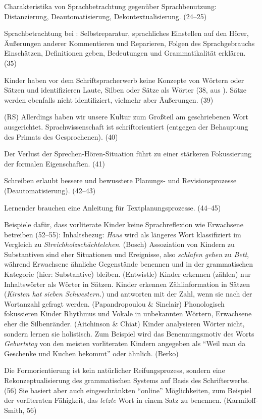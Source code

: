 Charakteristika von Sprachbetrachtung gegenüber Sprachbenutzung: Distanzierung, Deautomatisierung, Dekontextualisierung. (24--25)

Sprachbetrachtung bei \citet{Clark1978}: Selbstreparatur, sprachliches Einstellen auf den Hörer, Äußerungen anderer Kommentieren und Reparieren, Folgen des Sprachgebrauchs Einschätzen, Definitionen geben, Bedeutungen und Grammatikalität erklären. (35)

Kinder haben vor dem Schriftspracherwerb keine Konzepte von Wörtern oder Sätzen und identifizieren Laute, Silben oder Sätze als Wörter (38, aus \citealt{SteinigHuneke2002}).
Sätze werden ebenfalls nicht identifiziert, vielmehr aber Äußerungen. (39)

(RS) Allerdings haben wir unsere Kultur zum Großteil am geschriebenen Wort ausgerichtet.
Sprachwissenschaft ist schriftorientiert (entgegen der Behauptung des Primats des Gesprochenen). (40)

Der Verlust der Sprechen-Hören-Situation führt zu einer stärkeren Fokussierung der formalen Eigenschaften. (41)

Schreiben erlaubt bessere und bewusstere Planungs- und Revisionsprozesse (Deautomatisierung). (42--43)

Lernender brauchen eine Anleitung für Textplanungsprozesse. (44--45)

Beispiele dafür, dass vorliterate Kinder keine Sprachreflexion wie Erwachsene betreiben (52--55):
Inhaltsbezug: \textit{Haus} wird als längeres Wort klassifiziert im Vergleich zu \textit{Streichholzschächtelchen}. (Bosch)
Assoziation von Kindern zu Substantiven sind eher Situationen und Ereignisse, also \textit{schlafen gehen} zu \textit{Bett}, während Erwachsene ähnliche Gegenstände benennen und in der grammatischen Kategorie (hier: Substantive) bleiben. (Entwistle)
Kinder erkennen (zählen) nur Inhaltswörter als Wörter in Sätzen.
Kinder erkennen Zählinformation in Sätzen (\textit{Kirsten hat sieben Schwestern.}) und antworten mit der Zahl, wenn sie nach der Wortanzahl gefragt werden. (Papandropoulou \& Sinclair)
Phonologisch fokussieren Kinder Rhythmus und Vokale in unbekannten Wörtern, Erwachsene eher die Silbenränder. (Aitchinson \& Chiat)
Kinder analysieren Wörter nicht, sondern lernen sie holistisch. Zum Beispiel wird das Benennungsmotiv des Worts \textit{Geburtstag} von den meisten vorliteraten Kindern angegeben als "`Weil man da Geschenke und Kuchen bekommt"' oder ähnlich. (Berko)

Die Formorientierung ist kein natürlicher Reifungsprozess, sondern eine Rekonzeptualisierung des grammatischen Systems auf Basis des Schrifterwerbs. (56)
Sie basiert aber auch eingeschränkten "`online"' Möglichkeiten, zum Beispiel der vorliteraten Fähigkeit, das \textit{letzte} Wort in einem Satz zu benennen. (Karmiloff-Smith, 56)

